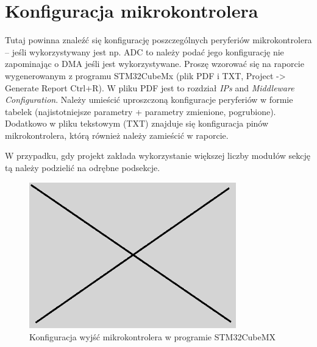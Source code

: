 \documentclass[10pt, a4paper]{article}
\begin{document}

 
\section{Konfiguracja mikrokontrolera}

Tutaj powinna znaleźć się konfigurację poszczególnych peryferiów 
mikrokontrolera -- jeśli wykorzystywany jest np. ADC to należy 
podać jego konfigurację nie zapominając o DMA jeśli jest 
wykorzystywane. Proszę wzorować się na raporcie wygenerowanym 
z programu STM32CubeMx 
(plik PDF i TXT, Project -> Generate Report Ctrl+R). 
W pliku PDF jest to rozdział \textit{IPs} and \textit{Middleware Configuration}. 
Należy umieścić uproszczoną konfiguracje peryferiów w formie 
tabelek (najistotniejsze parametry + parametry zmienione, pogrubione).
Dodatkowo w pliku tekstowym (TXT) znajduje się konfiguracja pinów 
mikrokontrolera, którą również należy zamieścić w raporcie.

W przypadku, gdy projekt zakłada wykorzystanie większej liczby modułów
sekcję tą należy podzielić na odrębne podsekcje.

\begin{figure}[H]
	\centering
	\includegraphics[width=0.8\textwidth]{obraz.png}
	\caption{Konfiguracja wyjść mikrokontrolera w programie STM32CubeMX}
	\label{fig:KonfiguracjaMikrokontrolera}
\end{figure}
\end{document}
